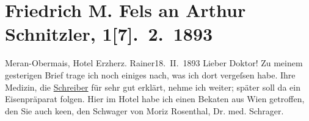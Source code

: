 

         
         \renewcommand{\erwaehntePersonen}{Personen:  ?? [Erzieher von Max von Fürstenberg], Friedrich Michael Fels, Maximilian Egon von Fürstenberg, Moritz Rosenthal, Sigmund Schraga, Joseph Schreiber}
         \renewcommand{\erwaehnteOrte}{Orte: Bozen, Erzherzog Rainer, Meran, München, Wien}
         \renewcommand{\erwaehnteWerke}{}
               \section[Friedrich M. Fels an Arthur Schnitzler, 1{[}7{]}. 2. 1893]{ Friedrich M. Fels an Arthur Schnitzler, 1{[}7{]}. 2. 1893}\nopagebreak{}\rehead{ }\begin{ledgroupsized}[t]{13cm}\normalsize\beginnumbering{} \toendnotes[C]{\smallbreak\pagebreak[2]} 
\toendnotes[C]{\smallbreak}\pstart
           \raggedleft{}{\pb}Meran-Obermais, Hotel Erzherz. Rainer18. II. 1893\pend
           \pstart{}Lieber Doktor!\pend\pstart
           Zu meinem gesterigen Brief trage ich noch einiges nach, was ich dort vergeſsen
               habe.\pend
           \pstart
           Ihre Medizin, die \uline{Schreiber} für sehr gut erklärt, nehme ich weiter; später soll da{\geminationn} ein Eisenpräparat folgen.\pend
           \pstart
           Hier im Hotel habe ich einen Beka{\geminationn}ten aus Wien getroffen, den Sie auch ke{\geminationn}en, den Schwager von Moriz Rosenthal, Dr. med. Schrager.

\end{ledgroupsized}
